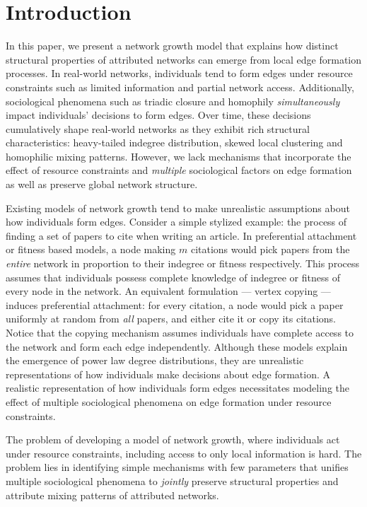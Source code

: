 \section{Introduction}
\label{sec:Introduction}



In this paper, we present a network growth model that explains how distinct
structural properties of attributed networks can emerge from local edge
formation processes. In real-world networks, individuals tend to form edges
under resource constraints such as limited information and partial network
access. Additionally, sociological phenomena such as triadic closure and
homophily \textit{simultaneously} impact individuals’ decisions to form edges.
Over time, these decisions cumulatively shape real-world networks as they
exhibit rich structural characteristics: heavy-tailed indegree distribution,
skewed local clustering and homophilic mixing patterns. However, we lack
mechanisms that incorporate the effect of resource constraints and
\textit{multiple} sociological factors on edge formation as well as preserve
global network structure.


Existing models of network growth tend to make unrealistic assumptions about how
individuals form edges. Consider a simple stylized example: the process of
finding a set of papers to cite when writing an article. In preferential
attachment \cite{barabasi1999emergence} or fitness \cite{X} based models, a node
making $m$ citations would pick papers from the \textit{entire} network in
proportion to their indegree or fitness respectively. This process assumes that
individuals possess complete knowledge of indegree or fitness of every node in
the network. An equivalent formulation — vertex copying \cite{X} — induces
preferential attachment: for every citation, a node would pick a paper uniformly
at random from \textit{all} papers, and either cite it or copy its citations.
Notice that the copying mechanism assumes individuals have complete access to
the network and form each edge independently. Although these models explain the
emergence of power law degree distributions, they are unrealistic
representations of how individuals make decisions about edge formation. A
realistic representation of how individuals form edges necessitates modeling the
effect of multiple sociological phenomena on edge formation under resource
constraints.

The problem of developing a model of network growth, where individuals act under
resource constraints, including access to only local information is hard. The
problem lies in identifying simple mechanisms with few parameters that unifies
multiple sociological phenomena to \textit{jointly} preserve structural
properties and attribute mixing patterns of attributed networks.

